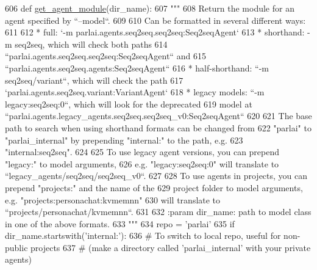 \begin{DoxyCode}
606 \textcolor{keyword}{def }\hyperlink{namespaceparlai_1_1core_1_1agents_a14a9d134d76ffd0509e50703d0f2c949}{get\_agent\_module}(dir\_name):
607     \textcolor{stringliteral}{"""}
608 \textcolor{stringliteral}{    Return the module for an agent specified by ``--model``.}
609 \textcolor{stringliteral}{}
610 \textcolor{stringliteral}{    Can be formatted in several different ways:}
611 \textcolor{stringliteral}{}
612 \textcolor{stringliteral}{    * full: `-m parlai.agents.seq2seq.seq2seq:Seq2seqAgent`}
613 \textcolor{stringliteral}{    * shorthand: -m seq2seq, which will check both paths}
614 \textcolor{stringliteral}{      ``parlai.agents.seq2seq.seq2seq:Seq2seqAgent`` and}
615 \textcolor{stringliteral}{      ``parlai.agents.seq2seq.agents:Seq2seqAgent``}
616 \textcolor{stringliteral}{    * half-shorthand: ``-m seq2seq/variant``, which will check the path}
617 \textcolor{stringliteral}{      `parlai.agents.seq2seq.variant:VariantAgent`}
618 \textcolor{stringliteral}{    * legacy models: ``-m legacy:seq2seq:0``, which will look for the deprecated}
619 \textcolor{stringliteral}{      model at ``parlai.agents.legacy\_agents.seq2seq.seq2seq\_v0:Seq2seqAgent``}
620 \textcolor{stringliteral}{}
621 \textcolor{stringliteral}{    The base path to search when using shorthand formats can be changed from}
622 \textcolor{stringliteral}{    "parlai" to "parlai\_internal" by prepending "internal:" to the path, e.g.}
623 \textcolor{stringliteral}{    "internal:seq2seq".}
624 \textcolor{stringliteral}{}
625 \textcolor{stringliteral}{    To use legacy agent versions, you can prepend "legacy:" to model arguments,}
626 \textcolor{stringliteral}{    e.g. "legacy:seq2seq:0" will translate to ``legacy\_agents/seq2seq/seq2seq\_v0``.}
627 \textcolor{stringliteral}{}
628 \textcolor{stringliteral}{    To use agents in projects, you can prepend "projects:" and the name of the}
629 \textcolor{stringliteral}{    project folder to model arguments, e.g. "projects:personachat:kvmemnn"}
630 \textcolor{stringliteral}{    will translate to ``projects/personachat/kvmemnn``.}
631 \textcolor{stringliteral}{}
632 \textcolor{stringliteral}{    :param dir\_name: path to model class in one of the above formats.}
633 \textcolor{stringliteral}{    """}
634     repo = \textcolor{stringliteral}{'parlai'}
635     \textcolor{keywordflow}{if} dir\_name.startswith(\textcolor{stringliteral}{'internal:'}):
636         \textcolor{comment}{# To switch to local repo, useful for non-public projects}
637         \textcolor{comment}{# (make a directory called 'parlai\_internal' with your private agents)}

\end{DoxyCode}
